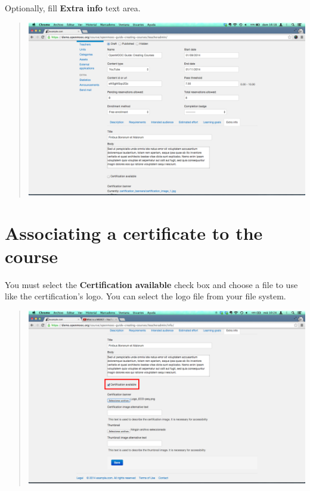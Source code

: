 \documentclass[letterpaper,10pt,english]{sphinxmanual}
\begin{document}
Optionally, fill \textbf{Extra info} text area.
\begin{quote}

\includegraphics{2_course_information-11.png}
\end{quote}


\section{Associating a certificate to the course}
\label{course_page:associating-a-certificate-to-the-course}
You must select the \textbf{Certification available} check box and choose a file to
use like the certification's logo. You can select the logo file from your file system.
\begin{quote}

\includegraphics{2_course_information-12.png}
\end{quote}
\end{document}
